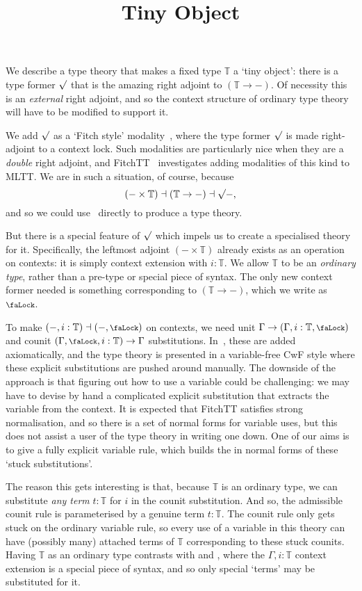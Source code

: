 \documentclass[10pt]{article}
\title{Tiny Object}
\author{}
\date{}
\theoremstyle{definition}
\newcommand{\lock}{\mathchoice {\scalebox{0.8}{\text{\faLock}}}
  {\scalebox{0.8}{\text{\faLock}}} {\scalebox{0.5}{\text{\faLock}}}
  {\scalebox{0.4}{\text{\faLock}}} }
\newcommand{\Tiny}{\mathbb{T}}
\newcommand{\rformu}[1]{\ThisStyle{\raisebox{0.07em}{$\SavedStyle \surd$}} #1}
\begin{document}
\maketitle

We describe a type theory that makes a fixed type $\Tiny$ a `tiny
object': there is a type former $\rformu$ that is the amazing right
adjoint to $(\Tiny \to -)$. Of necessity this is an \emph{external}
right adjoint, and so the context structure of ordinary type theory
will have to be modified to support it.

We add $\rformu$ as a `Fitch style'
modality~\cite{clouston:fitch-style}, where the type former $\rformu$
is made right-adjoint to a context lock. Such modalities are
particularly nice when they are a \emph{double} right adjoint, and
FitchTT~\cite{fitchtt} investigates adding modalities of this kind to
MLTT. We are in such a situation, of course, because
\[{(- \times \Tiny) \dashv (\Tiny \to -) \dashv \rformu -},\] and so
we could use~\cite{fitchtt} directly to produce a type theory.

But there is a special feature of $\rformu$ which impels us to create
a specialised theory for it. Specifically, the leftmost adjoint
$(- \times \Tiny)$ already exists as an operation on contexts: it is
simply context extension with $i : \Tiny$. We allow $\Tiny$ to be an
\emph{ordinary type}, rather than a pre-type or special piece of
syntax. The only new context former needed is something corresponding
to $(\Tiny \to -)$, which we write as $\lock$.

To make $(-,i:\Tiny) \dashv (-,\lock)$ on contexts, we need unit
$\Gamma \to (\Gamma,i : \Tiny, \lock)$ and counit
$(\Gamma,\lock,i : \Tiny) \to \Gamma$
substitutions. In~\cite{fitchtt}, these are added axiomatically, and
the type theory is presented in a variable-free CwF style where these
explicit substitutions are pushed around manually. The downside of the
approach is that figuring out how to use a variable could be
challenging: we may have to devise by hand a complicated explicit
substitution that extracts the variable from the context. It is
expected that FitchTT satisfies strong normalisation, and so there is
a set of normal forms for variable uses, but this does not assist a
user of the type theory in writing one down.  One of our aims is to
give a fully explicit variable rule, which builds the in normal forms
of these `stuck substitutions'.

The reason this gets interesting is that, because $\Tiny$ is an
ordinary type, we can substitute \emph{any term} $t : \Tiny$ for $i$
in the counit substitution. And so, the admissible counit rule is
parameterised by a genuine term $t : \Tiny$. The counit rule only gets
stuck on the ordinary variable rule, so every use of a variable in
this theory can have (possibly many) attached terms of $\Tiny$
corresponding to these stuck counits. Having $\Tiny$ as an ordinary
type contrasts with
\cite{cavallo-harper:parametricity-for-ctt,cavallo:thesis} and
\cite[Section 5]{fitchtt}, where the $\Gamma,i:\Tiny$ context
extension is a special piece of syntax, and so only special `terms'
may be substituted for it.
\end{document}
